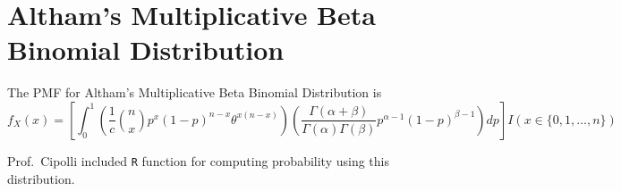\documentclass[
]{article}
\begin{document}
\normalsize

\section{Altham's Multiplicative Beta Binomial
Distribution}\label{althams-multiplicative-beta-binomial-distribution}

The PMF for Altham's Multiplicative Beta Binomial Distribution is
\[f_X(x) = \left[\int_{0}^1 \left(\frac{1}{c} {n \choose x} p^x (1-p)^{n-x} \theta^{x(n-x)}\right)\left(\frac{\Gamma(\alpha+\beta)}{\Gamma(\alpha)\Gamma(\beta)} p^{\alpha-1}(1-p)^{\beta-1}\right) dp\right]I(x \in \{0, 1, ..., n\})\]

Prof.~Cipolli included \texttt{R} function for computing probability
using this distribution.

\normalsize
\end{document}
